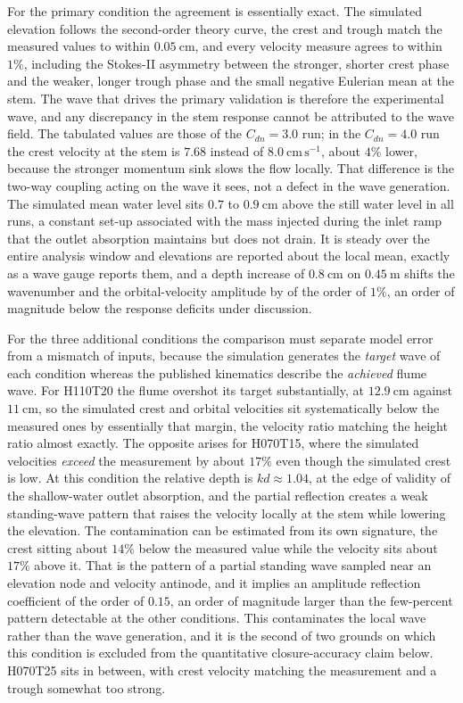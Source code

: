\noindent
For the primary condition the agreement is essentially exact. The simulated elevation follows the second-order theory curve, the crest and trough match the measured values to within $0.05~\mathrm{cm}$, and every velocity measure agrees to within $1\%$, including the Stokes-II asymmetry between the stronger, shorter crest phase and the weaker, longer trough phase and the small negative Eulerian mean at the stem. The wave that drives the primary validation is therefore the experimental wave, and any discrepancy in the stem response cannot be attributed to the wave field. The tabulated values are those of the $C_{dn} = 3.0$ run; in the $C_{dn} = 4.0$ run the crest velocity at the stem is $7.68$ instead of $8.0~\mathrm{cm\,s^{-1}}$, about $4\%$ lower, because the stronger momentum sink slows the flow locally. That difference is the two-way coupling acting on the wave it sees, not a defect in the wave generation. The simulated mean water level sits $0.7$ to $0.9~\mathrm{cm}$ above the still water level in all runs, a constant set-up associated with the mass injected during the inlet ramp that the outlet absorption maintains but does not drain. It is steady over the entire analysis window and elevations are reported about the local mean, exactly as a wave gauge reports them, and a depth increase of $0.8~\mathrm{cm}$ on $0.45~\mathrm{m}$ shifts the wavenumber and the orbital-velocity amplitude by of the order of $1\%$, an order of magnitude below the response deficits under discussion.

\noindent
For the three additional conditions the comparison must separate model error from a mismatch of inputs, because the simulation generates the \emph{target} wave of each condition whereas the published kinematics describe the \emph{achieved} flume wave. For H110T20 the flume overshot its target substantially, at $12.9~\mathrm{cm}$ against $11~\mathrm{cm}$, so the simulated crest and orbital velocities sit systematically below the measured ones by essentially that margin, the velocity ratio matching the height ratio almost exactly. The opposite arises for H070T15, where the simulated velocities \emph{exceed} the measurement by about $17\%$ even though the simulated crest is low. At this condition the relative depth is $kd \approx 1.04$, at the edge of validity of the shallow-water outlet absorption, and the partial reflection creates a weak standing-wave pattern that raises the velocity locally at the stem while lowering the elevation. The contamination can be estimated from its own signature, the crest sitting about $14\%$ below the measured value while the velocity sits about $17\%$ above it. That is the pattern of a partial standing wave sampled near an elevation node and velocity antinode, and it implies an amplitude reflection coefficient of the order of $0.15$, an order of magnitude larger than the few-percent pattern detectable at the other conditions. This contaminates the local wave rather than the wave generation, and it is the second of two grounds on which this condition is excluded from the quantitative closure-accuracy claim below. H070T25 sits in between, with crest velocity matching the measurement and a trough somewhat too strong.

